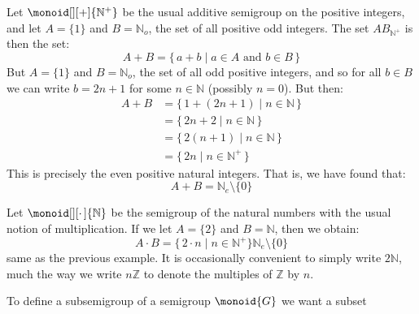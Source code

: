         \begin{example}
            Let $\monoid[][+]{\mathbb{N}^{+}}$ be the usual additive semigroup
            on the positive integers, and let $A=\{1\}$ and
            $B=\mathbb{N}_{o}$, the set of all positive odd integers. The set
            $AB_{\mathbb{N}^{+}}$ is then the set:
            \begin{equation}
                A+B=\{\,a+b\;|\;a\in{A}\textrm{ and }b\in{B}\,\}
            \end{equation}
            But $A=\{1\}$ and $B=\mathbb{N}_{o}$, the set of all odd positive
            integers, and so for all $b\in{B}$ we can write $b=2n+1$ for
            some $n\in\mathbb{N}$ (possibly $n=0$). But then:
            \begin{subequations}
                \begin{align}
                    A+B&=\{\,1+(2n+1)\;|\;n\in\mathbb{N}\,\}\\
                        &=\{\,2n+2\;|\;n\in\mathbb{N}\,\}\\
                        &=\{\,2(n+1)\;|\;n\in\mathbb{N}\,\}\\
                        &=\{\,2n\;|\;n\in\mathbb{N}^{+}\,\}
                \end{align}
            \end{subequations}
            This is precisely the even positive natural integers. That is, we
            have found that:
            \begin{equation}
                A+B=\mathbb{N}_{e}\setminus\{0\}
            \end{equation}
        \end{example}
        \begin{example}
            Let $\monoid[][\cdot\,]{\mathbb{N}}$ be the semigroup of the
            natural numbers with the usual notion of multiplication. If we let
            $A=\{2\}$ and $B=\mathbb{N}$, then we obtain:
            \begin{equation}
                A\cdot{B}=\{\,2\cdot{n}\;|\;n\in\mathbb{N}^{+}\}
                    \mathbb{N}_{e}\setminus\{0\}
            \end{equation}
            same as the previous example. It is occasionally convenient to
            simply write $2\mathbb{N}$, much the way we write $n\mathbb{Z}$ to
            denote the multiples of $\mathbb{Z}$ by $n$.
        \end{example}
        To define a subsemigroup of a semigroup $\monoid{G}$ we want a subset
